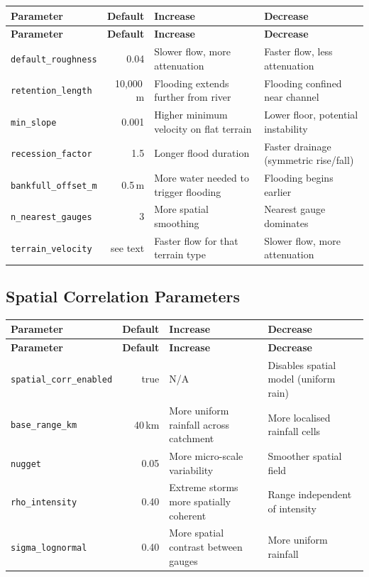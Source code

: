 \documentclass[11pt,a4paper]{article}
\begin{document}
\begin{longtable}{p{4.2cm}rp{3.5cm}p{3.5cm}}
\toprule
\textbf{Parameter} & \textbf{Default} & \textbf{Increase} & \textbf{Decrease} \\
\midrule
\endfirsthead
\toprule
\textbf{Parameter} & \textbf{Default} & \textbf{Increase} & \textbf{Decrease} \\
\midrule
\endhead
\texttt{default\_roughness} & 0.04 &
  Slower flow, more attenuation &
  Faster flow, less attenuation \\[4pt]
\texttt{retention\_length} & 10,000\,m &
  Flooding extends further from river &
  Flooding confined near channel \\[4pt]
\texttt{min\_slope} & 0.001 &
  Higher minimum velocity on flat terrain &
  Lower floor, potential instability \\[4pt]
\texttt{recession\_factor} & 1.5 &
  Longer flood duration &
  Faster drainage (symmetric rise/fall) \\[4pt]
\texttt{bankfull\_offset\_m} & 0.5\,m &
  More water needed to trigger flooding &
  Flooding begins earlier \\[4pt]
\texttt{n\_nearest\_gauges} & 3 &
  More spatial smoothing &
  Nearest gauge dominates \\[4pt]
\texttt{terrain\_velocity} & see text &
  Faster flow for that terrain type &
  Slower flow, more attenuation \\
\bottomrule
\end{longtable}

\subsection{Spatial Correlation Parameters}

\begin{longtable}{p{4.2cm}rp{3.5cm}p{3.5cm}}
\toprule
\textbf{Parameter} & \textbf{Default} & \textbf{Increase} & \textbf{Decrease} \\
\midrule
\endfirsthead
\toprule
\textbf{Parameter} & \textbf{Default} & \textbf{Increase} & \textbf{Decrease} \\
\midrule
\endhead
\texttt{spatial\_corr\_enabled} & true &
  N/A &
  Disables spatial model (uniform rain) \\[4pt]
\texttt{base\_range\_km} & 40\,km &
  More uniform rainfall across catchment &
  More localised rainfall cells \\[4pt]
\texttt{nugget} & 0.05 &
  More micro-scale variability &
  Smoother spatial field \\[4pt]
\texttt{rho\_intensity} & 0.40 &
  Extreme storms more spatially coherent &
  Range independent of intensity \\[4pt]
\texttt{sigma\_lognormal} & 0.40 &
  More spatial contrast between gauges &
  More uniform rainfall \\
\bottomrule
\end{longtable}
\end{document}
